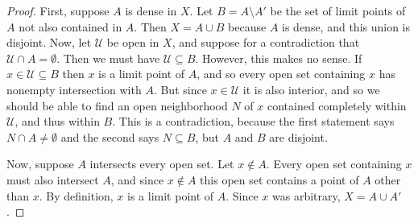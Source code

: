 \documentclass[10pt]{article}
\newcommand{\U}{\mathcal{U}}
\begin{document}
\begin{enumerate}
\begin{proof}
First, suppose $A$ is dense in $X$.  Let $B = A \setminus A'$ be the set of limit points of $A$ not also contained in $A$.  Then $X = A \cup B$ because $A$ is dense, and this union is disjoint.  Now, let $\U$ be open in $X$, and suppose for a contradiction that $\U \cap A = \emptyset$.  Then we must have $\U \subseteq B$.  However, this makes no sense.  If $x \in \U \subseteq B$ then $x$ is a limit point of $A$, and so every open set containing $x$ has nonempty intersection with $A$.  But since $x \in \U$ it is also interior, and so we should be able to find an open neighborhood $N$ of $x$ contained completely within $\U$, and thus within $B$.  This is a contradiction, because the first statement says $N \cap A \neq \emptyset$ and the second says $N \subseteq B$, but $A$ and $B$ are disjoint.

Now, suppose $A$ intersects every open set.  Let $x \not \in A$.  Every open set containing $x$ must also intersect $A$, and since $x \not \in A$ this open set contains a point of $A$ other than $x$.  By definition, $x$ is a limit point of $A$.  Since $x$ was arbitrary, $X = A \cup A'$.
\end{proof}

\end{enumerate}
\end{document}
